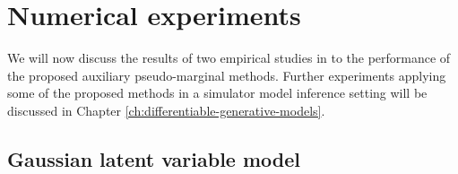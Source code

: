 
\section{Numerical experiments}

We will now discuss the results of two empirical studies in to the performance of the proposed auxiliary pseudo-marginal methods. Further experiments applying some of the proposed methods in a simulator model inference setting will be discussed in Chapter \ref{ch:differentiable-generative-models}.

\subsection{Gaussian latent variable model}\label{subsec:pm-normal-latent-model-exp}

